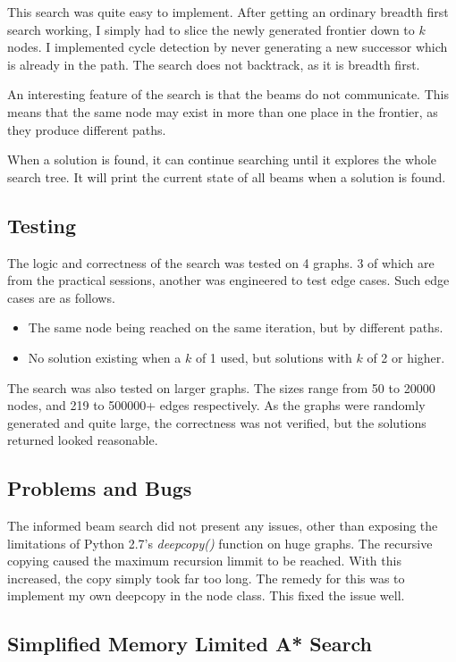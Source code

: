 \documentclass[]{article}
\begin{document}
	This search was quite easy to implement. After getting an ordinary breadth first search working, I simply had to slice the newly generated frontier down to $\mathit{k}$ nodes. I implemented cycle detection by never generating  a new successor which is already in the path. The search does not backtrack, as it is breadth first.
	
	An interesting feature of the search is that the beams do not communicate. This means that the same node may exist in more than one place in the frontier, as they produce different paths.
	
	When a solution is found, it can continue searching until it explores the whole search tree. It will print the current state of all beams when a solution is found.
	
\subsection*{Testing}
The logic and correctness of the search was tested on 4 graphs. 3 of which are from the practical sessions, another was engineered to test edge cases. Such edge cases are as follows.

\begin{itemize}
	\item The same node being reached on the same iteration, but by different paths.
	\item No solution existing when a $\mathit{k}$ of 1 used, but solutions with $\mathit{k}$ of 2 or higher.
\end{itemize}

The search was also tested on larger graphs. The sizes range from 50 to 20000 nodes, and 219 to 500000+ edges respectively. As the graphs were randomly generated and quite large, the correctness was not verified, but the solutions returned looked reasonable.
\subsection*{Problems and Bugs}
The informed beam search did not present any issues, other than exposing the limitations of Python 2.7's \textit{deepcopy()} function on huge graphs. The recursive copying caused the maximum recursion limmit to be reached. With this increased, the copy simply took far too long. The remedy for this was to implement my own deepcopy in the node class. This fixed the issue well.

\pagebreak

\begin{center}
	\section*{Simplified Memory Limited A* Search}
\end{center}
\end{document}
